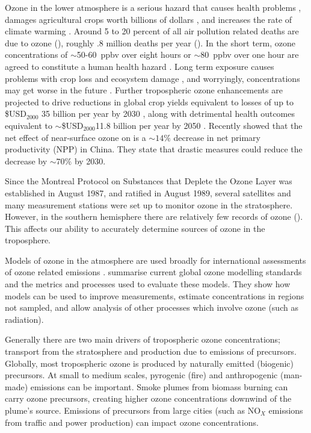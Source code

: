   Ozone in the lower atmosphere is a serious hazard that causes health problems \citep{Hsieh2013}, damages agricultural crops worth billions of dollars \citep{Avnery2011,Yue2017}, and increases the rate of climate warming \citep{IPCC_2013_chap8}.
  Around 5 to 20 percent of all air pollution related deaths are due to ozone (\cite{Monks2015}), roughly .8 million deaths per year (\cite{Lelieveld2013}).
  In the short term, ozone concentrations of $\sim$50-60~ppbv over eight hours or $\sim$80~ppbv over one hour are agreed to constitute a human health hazard \citep{Ayers2006,Lelieveld2009}. 
  Long term exposure causes problems with crop loss and ecosystem damage \citep{Emberson2003}, and worryingly, concentrations may get worse in the future \citep{Lelieveld2009, Stevenson2013}.
  Further tropospheric ozone enhancements are projected to drive reductions in global crop yields equivalent to losses of up to \$USD$_{2000}$ 35 billion per year by 2030 \citep{Avnery2011}, along with detrimental health outcomes equivalent to $\sim$\$USD$_{2000}$11.8 billion per year by 2050 \citep{Selin2009}.
  Recently \cite{Yue2017} showed that the net effect of near-surface ozone on is a $\sim 14\%$ decrease in net primary productivity (NPP) in China.
  They state that drastic measures could reduce the decrease by $\sim 70\%$ by 2030.
  
  Since the Montreal Protocol on Substances that Deplete the Ozone Layer was established in August 1987, and ratified in August 1989, several satellites and many measurement stations were set up to monitor ozone in the stratosphere.
  However, in the southern hemisphere there are relatively few records of ozone (\cite{Huang2017}).
  This affects our ability to accurately determine sources of ozone in the troposphere.
  
  Models of ozone in the atmosphere are used broadly for international assessments of ozone related emissions \citep{Young2018}.
  \cite{Young2018} summarise current global ozone modelling standards and the metrics and processes used to evaluate these models.
  They show how models can be used to improve measurements, estimate concentrations in regions not sampled, and allow analysis of other processes which involve ozone (such as radiation).
  
  Generally there are two main drivers of tropospheric ozone concentrations; transport from the stratosphere and production due to emissions of precursors. 
  Globally, most tropospheric ozone is produced by naturally emitted (biogenic) precursors.
  At small to medium scales, pyrogenic (fire) and anthropogenic (man-made) emissions can be important.
  Smoke plumes from biomass burning can carry ozone precursors, creating higher ozone concentrations downwind of the plume's source.
  Emissions of precursors from large cities (such as NO$_X$ emissions from traffic and power production) can impact ozone concentrations.
  
